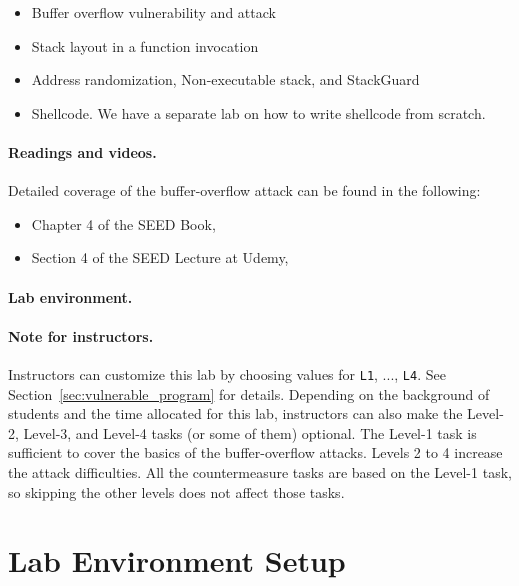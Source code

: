 \begin{itemize}[noitemsep]
\item Buffer overflow vulnerability and attack
\item Stack layout in a function invocation
\item Address randomization, Non-executable stack, and  StackGuard
\item Shellcode. We have a separate lab on how to write shellcode 
from scratch.
\end{itemize}



\paragraph{Readings and videos.}
Detailed coverage of the buffer-overflow attack can be found in the following:

\begin{itemize}
\item Chapter 4 of the SEED Book, \seedbook
\item Section 4 of the SEED Lecture at Udemy, \seedcsvideo
\end{itemize}


\paragraph{Lab environment.} \seedenvironmentC


\paragraph{Note for instructors.}
Instructors can customize this lab by choosing values
for \texttt{L1}, ..., \texttt{L4}. See
Section~\ref{sec:vulnerable_program} for details.
Depending on the background of students and the time allocated
for this lab, instructors can also make the
Level-2, Level-3, and Level-4 tasks (or some of them) optional.
The Level-1 task is sufficient to cover the basics of
the buffer-overflow attacks. Levels 2 to 4
increase the attack difficulties.
All the countermeasure tasks are based on the Level-1 task,
so skipping the other levels does not affect those tasks.




\section{Lab Environment Setup} 

